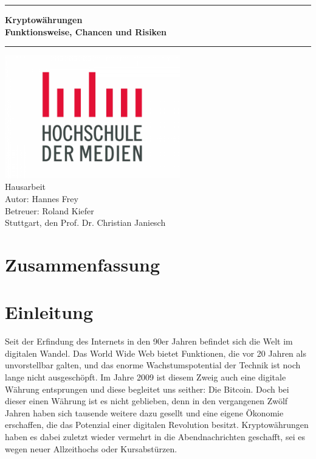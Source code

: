 \documentclass[12pt,oneside]{article}
\newcommand{\JMUTitle}[9]{

  \thispagestyle{empty}
  \vspace*{\stretch{1}}
  {\parindent0cm
  \rule{\linewidth}{.7ex}}
  \begin{flushright}
    \vspace*{\stretch{1}}
    \sffamily\bfseries\Huge
    #1\\
    \vspace*{\stretch{1}}
    \sffamily\bfseries\large
    #2
    \vspace*{\stretch{1}}
  \end{flushright}
  \rule{\linewidth}{.7ex}

  \vspace*{\stretch{1}}
  \begin{center}
    \includegraphics[width=3in]{logo} \\
    \vspace*{\stretch{1}}
    \Large Hausarbeit  \\

    \vspace*{\stretch{2}}
   \large Autor: Hannes Frey \\
    \vspace*{\stretch{1}}
    \large Betreuer:  Roland Kiefer \\[1mm]
    
    \vspace*{\stretch{1}}
    \large Stuttgart, den #6
  \end{center}
}
\begin{document}
  \JMUTitle
      {Kryptowährungen }        %
      {Funktionsweise, Chancen und Risiken}                        %
      
      {Wirtschaftswissenschaftlichen Fakultät}  %
      {W"urzburg 2018}                          %
      {31.05.2021}                              %
      {Prof. Dr. Christian Janiesch}               %
      {Zweitgutachter}                          %
      {Pr"ufungsdatum}                          %

  \clearpage

\lhead{}
    \setcounter{page}{1}

\tableofcontents
\clearpage

\listoffigures

\listoftables
\clearpage

\section*{Zusammenfassung}
\blindtext
\clearpage




\cleardoublepage
{}  
    \setcounter{page}{1}
\lhead{\nouppercase{\leftmark}}


\section{Einleitung} \label{einleitung}

Seit der Erfindung des Internets in den 90er Jahren befindet sich die Welt im digitalen Wandel. Das World Wide Web bietet Funktionen, die vor 20 Jahren als unvorstellbar galten, und das enorme Wachstumspotential der Technik ist noch lange nicht ausgeschöpft. Im Jahre 2009 ist diesem Zweig auch eine digitale Währung entsprungen und diese begleitet uns seither: Die Bitcoin. 
Doch bei dieser einen Währung ist es nicht geblieben, denn in den vergangenen Zwölf Jahren haben sich tausende weitere dazu gesellt und eine eigene Ökonomie erschaffen, die das Potenzial einer digitalen Revolution besitzt.
Kryptowährungen haben es dabei zuletzt wieder vermehrt in die Abendnachrichten geschafft, sei es wegen neuer Allzeithochs oder Kursabstürzen.\cite{schredder2018}
\end{document}
